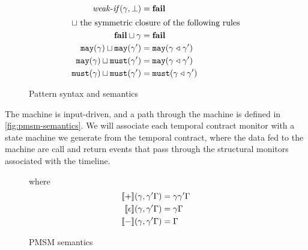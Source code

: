 \documentclass[preprint,onecolumn,9pt]{sigplanconf} %
\begin{document}
\begin{figure}
\begin{align*}
    \weakif(\mbindenv, \bot) &= \mfail
\\[2pt]
    \sqcup\span \text{ the symmetric closure of the following rules}
\\
    \mfail \sqcup \mbindenv &= \mfail 
\\
    \smay{\mbindenv} \sqcup \smay{\mbindenv'} &= \smay{\combinef{\mbindenv}{\mbindenv'}}
\\
    \smay{\mbindenv} \sqcup \smust{\mbindenv'} &= \smay{\combinef{\mbindenv}{\mbindenv'}}
\\
    \smust{\mbindenv} \sqcup \smust{\mbindenv'} &= \smust{\combinef{\mbindenv}{\mbindenv'}}
  \end{align*}
  \caption{Pattern syntax and semantics}
  \label{fig:pattern-syntax}
\end{figure}

The machine is input-driven, and a path through the machine is defined in \autoref{fig:pmsm-semantics}.
%
We will associate each temporal contract monitor with a state machine we generate from the temporal contract, where the data fed to the machine are call and return events that pass through the structural monitors associated with the timeline.

\begin{figure}
  \begin{mathpar}
  \end{mathpar}
  where
  \begin{align*}
    \denote{+}(\mbindenv, \mbindenv' \mbindstack) &= \mbindenv \mbindenv' \mbindstack
\\
    \denote{\epsilon}(\mbindenv, \mbindenv' \mbindstack) &= \mbindenv \mbindstack
\\
    \denote{-}(\mbindenv, \mbindenv' \mbindstack) &= \mbindstack
  \end{align*}
  \caption{PMSM semantics}
  \label{fig:pmsm-semantics}
\end{figure}
\end{document}
